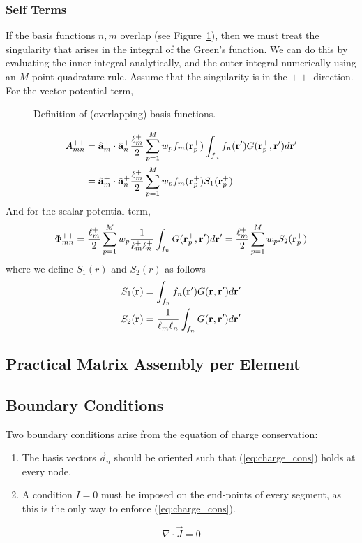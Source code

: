 \subsubsection{Self Terms}
If the basis functions $n, m$ overlap (see Figure~\ref{fig:mom_basis3}), then we must treat the singularity that arises in the integral of the Green's function. We can do this by evaluating the inner integral analytically, and the outer integral numerically using an $M$-point quadrature rule. Assume that the singularity is in the $++$ direction. For the vector potential term,
\begin{figure}[b]
	\centering
	
	\caption{Definition of (overlapping) basis functions.}
	\label{fig:mom_basis3}
\end{figure}
\begin{align*}
	A_{mn}^{++} & = \hat{\mathbf{a}}_m^{+} \cdot \hat{\mathbf{a}}_n^{+} \frac{\ell_m^+}{2} \sum_{p = 1}^M w_p f_m(\mathbf{r}_p^+) \int_{f_n} f_n(\mathbf{r}^\prime) G(\mathbf{r}_p^+, \mathbf{r}^\prime) d\mathbf{r}^\prime \\
	& = \hat{\mathbf{a}}_m^{+} \cdot \hat{\mathbf{a}}_n^{+} \frac{\ell_m^+}{2} \sum_{p = 1}^M w_p f_m(\mathbf{r}_p^+) S_1(\mathbf{r}_p^+)
\end{align*}
And for the scalar potential term,
\begin{equation*}
	\Phi_{mn}^{++} = \frac{\ell_m^+}{2} \sum_{p = 1}^M w_p \frac{1}{\ell_m^+ \ell_n^+} \int_{f_n} G(\mathbf{r}_p^+, \mathbf{r}^\prime) d\mathbf{r}^\prime  = \frac{\ell_m^+}{2} \sum_{p = 1}^M w_p S_2(\mathbf{r}_p^+)
\end{equation*}
where we define $S_1(r)$ and $S_2(r)$ as follows
\begin{align}
	S_1(\mathbf{r}) & = \int_{f_n} f_n(\mathbf{r}^\prime) G(\mathbf{r}, \mathbf{r}^\prime) d\mathbf{r}^\prime \\
	S_2(\mathbf{r}) & = \frac{1}{\ell_m \ell_n} \int_{f_n} G(\mathbf{r}, \mathbf{r}^\prime) d\mathbf{r}^\prime
\end{align}

\subsection{Practical Matrix Assembly per Element}

\subsection{Boundary Conditions}
\label{sec:mom_bc}
Two boundary conditions arise from the equation of charge conservation:
\begin{enumerate}
	\item The basis vectors $\vec{a}_n$ should be oriented such that (\ref{eq:charge_cons}) holds at every node.
	\item A condition $I = 0$ must be imposed on the end-points of every segment, as this is the only way to enforce (\ref{eq:charge_cons}).
\end{enumerate}
\begin{equation}
	\nabla \cdot \vec{J} = 0
	\label{eq:charge_cons}	
\end{equation}

